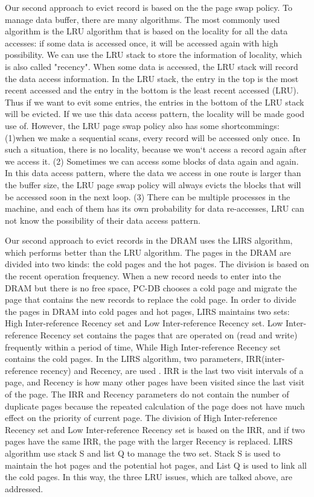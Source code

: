 Our second approach to evict record is based on the the page swap policy. To manage data buffer, there are many algorithms. The most commonly used algorithm is the LRU algorithm that is based on the locality for all the data accesses: if some data is accessed once, it will be accessed again with high possibility. We can use the LRU stack to store the information of locality, which is also called "recency". When some data is accessed, the LRU stack will record the data access information. In the LRU stack, the entry in the top is the most recent accessed and the entry in the bottom is the least recent accessed (LRU). Thus if we want to evit some entries, the entries in the bottom of the LRU stack will be evicted. If we use this data access pattern, the locality will be made good use of. However, the LRU page swap policy also has some shortcommings: (1)when we make a sequential scans, every record will be accessed only once. In such a situation, there is no locality, because we won`t access a record again after we access it. (2) Sometimes we can access some blocks of data again and again. In this data access pattern, where the data we access in one route is larger than the buffer size, the LRU page swap policy will always evicts the blocks that will be accessed soon in the next loop. (3) There can be multiple processes in the machine, and each of them has its own probability for data re-accesses, LRU can not know the possibility of their data access pattern. 

Our second approach to evict records in the DRAM uses the LIRS algorithm, which performs better than the LRU algorithm. The pages in the DRAM are divided into two kinds: the cold pages and the hot pages. The division is based on the recent operation frequency. When a new record needs to enter into the DRAM but there is no free space, PC-DB chooses a cold page and migrate the page that contains the new records to replace the cold page. In order to divide the pages in DRAM into cold pages and hot pages, LIRS maintains two sets: High Inter-reference Recency set and Low Inter-reference Recency set. Low Inter-reference Recency set contains the pages that are operated on (read and write) frequently within a period of time, While High Inter-reference Recency set contains the cold pages. In the LIRS algorithm, two parameters, IRR(inter-reference recency) and Recency, are used . IRR is the last two visit intervals of a page, and Recency is how many other pages have been visited since the last visit of the page. The IRR and Recency parameters do not contain the number of duplicate pages because the repeated calculation of the page does not have much effect on the priority of current page. The division of High Inter-reference Recency set and Low Inter-reference Recency set is based on the IRR, and if two pages have the same IRR, the page with the larger Recency is replaced. LIRS algorithm use stack S and list Q to manage the two set. Stack S is used to maintain the hot pages and the potential hot pages, and List Q is used to link all the cold pages. In this way, the three LRU issues, which are talked above, are addressed. 
